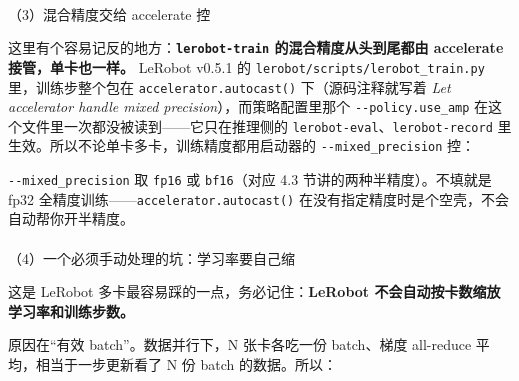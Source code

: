 \documentclass[
  chinese,
]{ctexart}
\makeatletter
\let\oldparagraph\paragraph
\renewcommand{\paragraph}{
    \@ifstar
      \xxxParagraphStar
      \xxxParagraphNoStar
  }
\newcommand{\xxxParagraphStar}[1]{\oldparagraph*{#1}\mbox{}}
\newcommand{\xxxParagraphNoStar}[1]{\oldparagraph{#1}\mbox{}}
\newenvironment{Shaded}{\begin{snugshade}}{\end{snugshade}}
\newcommand{\AttributeTok}[1]{\textcolor[rgb]{0.40,0.45,0.13}{#1}}
\newcommand{\DataTypeTok}[1]{\textcolor[rgb]{0.68,0.00,0.00}{#1}}
\newcommand{\ExtensionTok}[1]{\textcolor[rgb]{0.00,0.23,0.31}{#1}}
\newcommand{\FunctionTok}[1]{\textcolor[rgb]{0.28,0.35,0.67}{#1}}
\newcommand{\NormalTok}[1]{\textcolor[rgb]{0.00,0.23,0.31}{#1}}
\newcommand{\OperatorTok}[1]{\textcolor[rgb]{0.37,0.37,0.37}{#1}}
\newcommand{\VariableTok}[1]{\textcolor[rgb]{0.07,0.07,0.07}{#1}}
\makeatother
\begin{document}
\paragraph{（3）混合精度交给 accelerate
控}\label{ux6df7ux5408ux7cbeux5ea6ux4ea4ux7ed9-accelerate-ux63a7}

这里有个容易记反的地方：\textbf{\texttt{lerobot-train}
的混合精度从头到尾都由 accelerate 接管，单卡也一样。} LeRobot v0.5.1 的
\texttt{lerobot/scripts/lerobot\_train.py} 里，训练步整个包在
\texttt{accelerator.autocast()} 下（源码注释就写着 \emph{Let accelerator
handle mixed precision}），而策略配置里那个 \texttt{-\/-policy.use\_amp}
在这个文件里一次都没被读到------它只在推理侧的
\texttt{lerobot-eval}、\texttt{lerobot-record}
里生效。所以不论单卡多卡，训练精度都用启动器的
\texttt{-\/-mixed\_precision} 控：

\begin{Shaded}
\end{Shaded}

\texttt{-\/-mixed\_precision} 取 \texttt{fp16} 或 \texttt{bf16}（对应
4.3 节讲的两种半精度）。不填就是 fp32
全精度训练------\texttt{accelerator.autocast()}
在没有指定精度时是个空壳，不会自动帮你开半精度。

\paragraph{（4）一个必须手动处理的坑：学习率要自己缩}\label{ux4e00ux4e2aux5fc5ux987bux624bux52a8ux5904ux7406ux7684ux5751ux5b66ux4e60ux7387ux8981ux81eaux5df1ux7f29}

这是 LeRobot 多卡最容易踩的一点，务必记住：\textbf{LeRobot
不会自动按卡数缩放学习率和训练步数。}

原因在``有效 batch''。数据并行下，N 张卡各吃一份 batch、梯度 all-reduce
平均，相当于一步更新看了 N 份 batch 的数据。所以：
\end{document}
